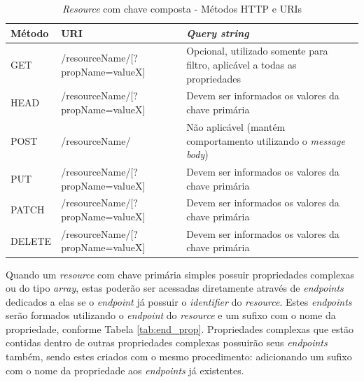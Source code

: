 \begin{table}[]
    \centering
    \begin{tabularx}{\textwidth}{|l|l|X|}
        \hline
        \textbf{Método} & \textbf{URI} & \textbf{\textit{Query string}} \\
        \hline

        GET & /resourceName/[?propName=valueX] & Opcional, utilizado somente para filtro, aplicável a todas as propriedades\\
        \hline

        HEAD & /resourceName/[?propName=valueX] & Devem ser informados os valores da chave primária\\
        \hline

        POST & /resourceName/ & Não aplicável (mantém comportamento utilizando o \textit{message body})\\
        \hline

        PUT & /resourceName/[?propName=valueX] & Devem ser informados os valores da chave primária\\
        \hline

        PATCH & /resourceName/[?propName=valueX] & Devem ser informados os valores da chave primária\\
        \hline

        DELETE & /resourceName/[?propName=valueX] & Devem ser informados os valores da chave primária\\
        \hline
    \end{tabularx}
    \caption{\textit{Resource} com chave composta - Métodos HTTP e URIs}
    \label{tab:http_2}
\end{table}

Quando um \textit{resource} com chave primária simples possuir propriedades complexas ou do tipo \textit{array}, estas poderão ser acessadas diretamente através de \textit{endpoints} dedicados a elas se o \textit{endpoint} já possuir o \textit{identifier} do \textit{resource}. Estes \textit{endpoints} serão formados utilizando o \textit{endpoint} do \textit{resource} e um sufixo com o nome da propriedade, conforme Tabela \ref{tab:end_prop}. Propriedades complexas que estão contidas dentro de outras propriedades complexas possuirão seus \textit{endpoints} também, sendo estes criados com o mesmo procedimento: adicionando um sufixo com o nome da propriedade aos \textit{endpoints} já existentes.

